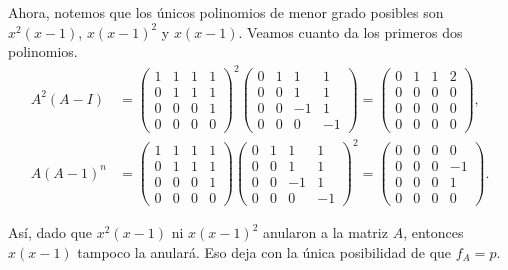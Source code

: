 \begin{example}
    Ahora, notemos que los únicos polinomios de menor grado posibles son $x^2(x-1)$, $x(x-1)^2$ y $x(x-1)$. Veamos cuanto da los primeros dos polinomios.
    \begin{align*}
      A^2(A-I) &= \begin{pmatrix}
        1 & 1 & 1 & 1 \\
        0 & 1 & 1 & 1 \\
        0 & 0 & 0 & 1 \\
        0 & 0 & 0 & 0
      \end{pmatrix}^2 \begin{pmatrix}
        0 & 1 & 1 & 1 \\
        0 & 0 & 1 & 1 \\
        0 & 0 & -1 & 1 \\
        0 & 0 & 0 & -1
      \end{pmatrix}  
      = \begin{pmatrix}
        0 & 1 & 1 & 2 \\
         0 & 0 & 0 &0  \\ 
         0 & 0 & 0 & 0 \\ 
         0 & 0 & 0 & 0
       \end{pmatrix}, \\
       A(A-1)^n &=
       \begin{pmatrix}
        1 & 1 & 1 & 1 \\
        0 & 1 & 1 & 1 \\
        0 & 0 & 0 & 1 \\
        0 & 0 & 0 & 0
      \end{pmatrix} \begin{pmatrix}
        0 & 1 & 1 & 1 \\
        0 & 0 & 1 & 1 \\
        0 & 0 & -1 & 1 \\
        0 & 0 & 0 & -1
      \end{pmatrix}^2
      = \begin{pmatrix} 0 & 0 & 0 & 0 \\ 0 & 0 & 0 & -1 \\ 0 & 0 & 0 & 1 \\ 0 & 0 & 0 & 0 \end{pmatrix}.
    \end{align*}
  
  Así, dado que $x^2(x-1)$ ni $x(x-1)^2$ anularon a la matriz $A$, entonces $x(x-1)$ tampoco la anulará. Eso deja con la única posibilidad de que $f_A = p$.
\end{example}